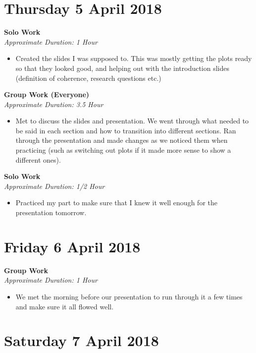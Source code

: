 \documentclass[12pt]{article}\usepackage[]{graphicx}\usepackage[]{color}
\begin{document}
\begin{itemize}
\section*{Thursday 5 April 2018}

\textbf{Solo Work}\\
\emph{Approximate Duration: 1 Hour}
\begin{itemize}
\item Created the slides I was supposed to. This was mostly getting the plots ready so that they looked good, and helping out with the introduction slides (definition of coherence, research questions etc.)
\end{itemize}

\textbf{Group Work (Everyone)} \\
\emph{Approximate Duration: 3.5 Hour}

\begin{itemize}
\item Met to discuss the slides and presentation. We went through what needed to be said in each section and how to transition into different sections. Ran through the presentation and made changes as we noticed them when practicing (such as switching out plots if it made more sense to show a different ones).
\end{itemize}

\textbf{Solo Work}\\
\emph{Approximate Duration: 1/2 Hour}
\begin{itemize}
\item Practiced my part to make sure that I knew it well enough for the presentation tomorrow.
\end{itemize}

\section*{Friday 6 April 2018}

\textbf{Group Work}\\
\emph{Approximate Duration: 1 Hour}
\begin{itemize}
\item We met the morning before our presentation to run through it a few times and make sure it all flowed well.
\end{itemize}

\section*{Saturday 7 April 2018}


\end{itemize}
\end{document}
